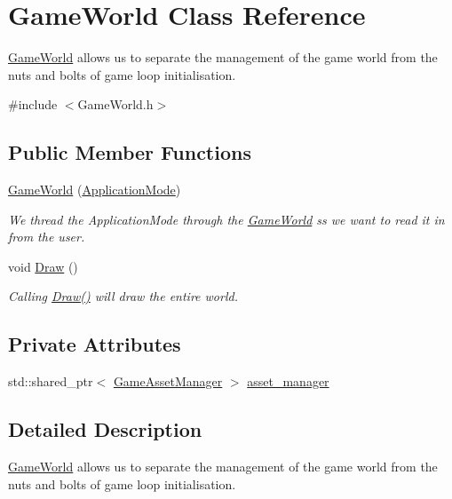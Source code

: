 \hypertarget{classGameWorld}{}\section{Game\+World Class Reference}
\label{classGameWorld}


\hyperlink{classGameWorld}{Game\+World} allows us to separate the management of the game world from the nuts and bolts of game loop initialisation.  




{\ttfamily \#include $<$Game\+World.\+h$>$}

\subsection*{Public Member Functions}
\begin{DoxyCompactItemize}
\item 
\hyperlink{classGameWorld_a17a84e57a80600961088afc753036f89}{Game\+World} (\hyperlink{common_8h_add86e7c88dd109abea3f708b422f31f0}{Application\+Mode})
\begin{DoxyCompactList}\small\item\em We thread the Application\+Mode through the \hyperlink{classGameWorld}{Game\+World} ss we want to read it in from the user. \end{DoxyCompactList}\item 
void \hyperlink{classGameWorld_a275418607d8286979b276f165ad5876b}{Draw} ()
\begin{DoxyCompactList}\small\item\em Calling \hyperlink{classGameWorld_a275418607d8286979b276f165ad5876b}{Draw()} will draw the entire world. \end{DoxyCompactList}\end{DoxyCompactItemize}
\subsection*{Private Attributes}
\begin{DoxyCompactItemize}
\item 
std\+::shared\+\_\+ptr$<$ \hyperlink{classGameAssetManager}{Game\+Asset\+Manager} $>$ \hyperlink{classGameWorld_aec5c0bca4fb5a41e4aac2dce2871266d}{asset\+\_\+manager}
\end{DoxyCompactItemize}


\subsection{Detailed Description}
\hyperlink{classGameWorld}{Game\+World} allows us to separate the management of the game world from the nuts and bolts of game loop initialisation. 

